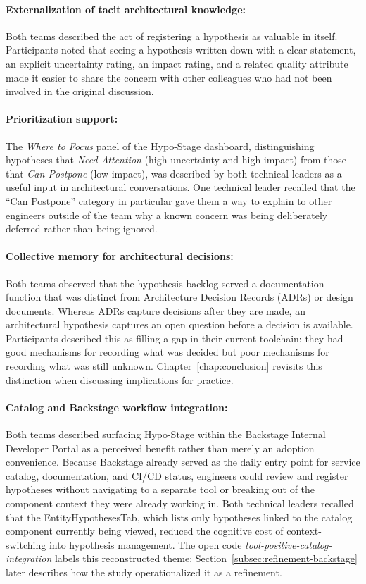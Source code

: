 \paragraph{Externalization of tacit architectural knowledge:}
Both teams described the act of registering a hypothesis as valuable in itself.
Participants noted that seeing a hypothesis written down with a clear statement,
an explicit uncertainty rating, an impact rating, and a related quality attribute
made it easier to share the concern with other colleagues who had not been involved
in the original discussion.

\paragraph{Prioritization support:}
The \textit{Where to Focus} panel of the Hypo-Stage dashboard, distinguishing
hypotheses that \textit{Need Attention} (high uncertainty and high impact) from
those that \textit{Can Postpone} (low impact), was described by both technical
leaders as a useful input in architectural conversations. One technical leader
recalled that the ``Can Postpone'' category in particular gave them a way to
explain to other engineers outside of the team why a known concern was being
deliberately deferred rather than being ignored.

\paragraph{Collective memory for architectural decisions:}
Both teams observed that the hypothesis backlog served a documentation function
that was distinct from Architecture Decision Records (ADRs) or design documents.
Whereas ADRs capture decisions after they are made, an architectural hypothesis
captures an open question before a decision is available. Participants described
this as filling a gap in their current toolchain: they had good mechanisms for
recording what was decided but poor mechanisms for recording what was still
unknown.
Chapter~\ref{chap:conclusion} revisits this distinction when discussing implications for practice.

\paragraph{Catalog and Backstage workflow integration:}
Both teams described surfacing Hypo-Stage within the Backstage Internal Developer
Portal as a perceived benefit rather than merely an adoption convenience.
Because Backstage already served as the daily entry point for service catalog,
documentation, and CI/CD status, engineers could review and register hypotheses
without navigating to a separate tool or breaking out of the component context
they were already working in. Both technical leaders recalled that the
EntityHypothesesTab, which lists only hypotheses linked to the catalog component
currently being viewed, reduced the cognitive cost of context-switching into
hypothesis management. The open code \textit{tool-positive-catalog-integration}
labels this reconstructed theme; Section~\ref{subsec:refinement-backstage}
later describes how the study operationalized it as a refinement.

